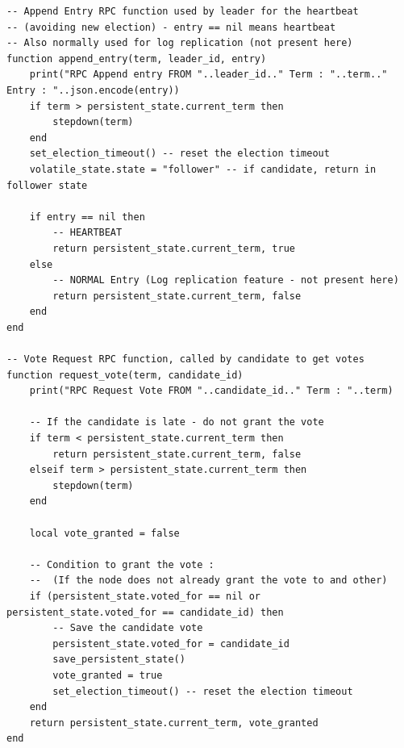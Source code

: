 \documentclass{eplmastersthesis}
\begin{document}
        \begin{minipage}{\linewidth}
        \begin{lstlisting}[style=MySmallLua,caption={RPC functions}]
-- Append Entry RPC function used by leader for the heartbeat
-- (avoiding new election) - entry == nil means heartbeat
-- Also normally used for log replication (not present here)
function append_entry(term, leader_id, entry)
    print("RPC Append entry FROM "..leader_id.." Term : "..term.." Entry : "..json.encode(entry))
    if term > persistent_state.current_term then
        stepdown(term)
    end
    set_election_timeout() -- reset the election timeout
    volatile_state.state = "follower" -- if candidate, return in follower state

    if entry == nil then
        -- HEARTBEAT
        return persistent_state.current_term, true
    else
        -- NORMAL Entry (Log replication feature - not present here)
        return persistent_state.current_term, false
    end
end

-- Vote Request RPC function, called by candidate to get votes
function request_vote(term, candidate_id)
    print("RPC Request Vote FROM "..candidate_id.." Term : "..term)

    -- If the candidate is late - do not grant the vote
    if term < persistent_state.current_term then
        return persistent_state.current_term, false
    elseif term > persistent_state.current_term then
        stepdown(term)
    end

    local vote_granted = false

    -- Condition to grant the vote :
    --  (If the node does not already grant the vote to and other)
    if (persistent_state.voted_for == nil or persistent_state.voted_for == candidate_id) then
        -- Save the candidate vote
        persistent_state.voted_for = candidate_id
        save_persistent_state()
        vote_granted = true
        set_election_timeout() -- reset the election timeout
    end
    return persistent_state.current_term, vote_granted
end
        \end{lstlisting}
        \end{minipage}
\end{document}
